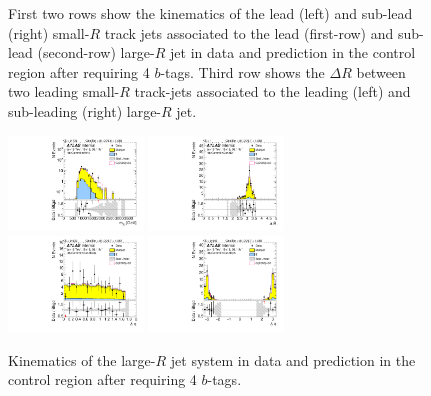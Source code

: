 \begin{figure}[htbp!]
\begin{center}
  \caption{First two rows show the kinematics of the lead (left) and sub-lead (right) small-$R$ track jets associated to the lead (first-row) and sub-lead (second-row) large-$R$ jet in data and prediction in the control region after requiring 4 $b$-tags. Third row shows the $\Delta R$ between two leading small-$R$ track-jets associated to the leading (left) and sub-leading (right) large-$R$ jet.  }
  \label{fig:boosted-4b-control-ak2}
\end{center}
\end{figure}


\begin{figure}[htbp!]
\begin{center}
\includegraphics[width=0.32\textwidth,angle=-90]{figures/boosted/Control/b77_FourTag_Control_mHH_l_1.pdf}
\includegraphics[width=0.32\textwidth,angle=-90]{figures/boosted/Control/b77_FourTag_Control_hCandDr.pdf}\\
\includegraphics[width=0.32\textwidth,angle=-90]{figures/boosted/Control/b77_FourTag_Control_hCandDeta.pdf}
\includegraphics[width=0.32\textwidth,angle=-90]{figures/boosted/Control/b77_FourTag_Control_hCandDphi.pdf}
  \caption{Kinematics of the large-$R$ jet system in data and prediction in the control region after requiring 4 $b$-tags.  }
  \label{fig:boosted-4b-control-ak10-system}
\end{center}
\end{figure}

